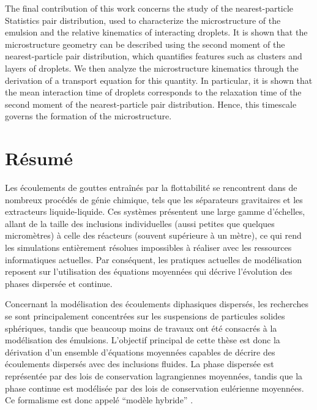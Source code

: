 The final contribution of this work concerns the study of the nearest-particle Statistics pair distribution, used to characterize the microstructure of the emulsion and the relative kinematics   of interacting droplets.
It is shown that the microstructure geometry can be described using the second moment of the nearest-particle pair distribution, which quantifies features such as clusters and layers of droplets.
We then analyze the microstructure kinematics   through the derivation of a transport equation for this quantity.
In particular, it is shown that the mean interaction time of droplets corresponds to the relaxation time of the second moment of the nearest-particle pair distribution. 
Hence, this timescale governs the formation of the microstructure.




\newpage
\chapter*{\centering R\'esum\'e}

Les \'ecoulements de gouttes entraîn\'es par la flottabilit\'e se rencontrent dans de nombreux proc\'ed\'es de g\'enie chimique, tels que les séparateurs gravitaires et les extracteurs liquide-liquide.
Ces syst\`emes pr\'esentent une large gamme d'\'echelles, allant de la taille des inclusions individuelles (aussi petites que quelques microm\`etres) \`a celle des r\'eacteurs (souvent sup\'erieure \`a un m\`etre), ce qui rend les simulations enti\`erement r\'esolues impossibles \`a r\'ealiser avec les ressources informatiques actuelles.
Par cons\'equent, les pratiques actuelles de mod\'elisation reposent sur l'utilisation des \'equations moyenn\'ees qui d\'ecrive l'\'evolution des phases dispers\'ee et continue.


Concernant la mod\'elisation des \'ecoulements diphasiques dispers\'es, les recherches se sont principalement concentr\'ees sur les suspensions de particules solides sph\'eriques, tandis que beaucoup moins de travaux ont \'et\'e consacr\'es \`a la mod\'elisation des \'emulsions.
L'objectif principal de cette th\`ese est donc la d\'erivation d'un ensemble d'\'equations moyen\-n\'ees capables de d\'ecrire des \'ecoulements dispers\'es avec des inclusions fluides. %
La phase dispers\'ee est repr\'esent\'ee par des lois de conservation lagrangiennes  moyenn\'ees, tandis que la phase continue est mod\'elis\'ee par des lois de conservation eul\'erienne moyenn\'ees.
Ce formalisme est donc appel\'e  ``mod\`ele hybride'' .

